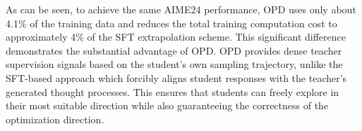 \documentclass{article}
\theoremstyle{plain}
\theoremstyle{definition}
\theoremstyle{remark}
\begin{document}
As can be seen, to achieve the same AIME24 performance, OPD uses only about 4.1\% of the training data and reduces the total training computation cost to approximately 4\% of the SFT extrapolation scheme. This significant difference demonstrates the substantial advantage of OPD. OPD provides dense teacher supervision signals based on the student's own sampling trajectory, unlike the SFT-based approach which forcibly aligns student responses with the teacher's generated thought processes. This ensures that students can freely explore in their most suitable direction while also guaranteeing the correctness of the optimization direction.


\begin{table}[t]
\centering
\caption{The estimated OPD and SFT computation FLOPs under the Qwen3-8B $\rightarrow$ Llama3.1-8B-SFT configuration. These FLOPs estimates are based on the model configurations of the teacher (Qwen3-8B) and student (Llama3.1-8B) models, assuming each sample contains 16K tokens.}
\vspace{0.45em}
\small
\setlength{\tabcolsep}{5pt}
\renewcommand{\arraystretch}{1.12}
\vspace{10pt}
\label{tab:compute_cost}
\end{table}


\end{document}

